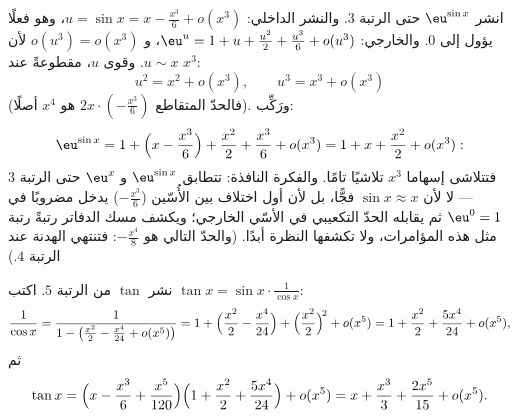 \begin{example}\label{ex:b1:taylor:esin}
انشر $\eu^{\sin x}$ حتى الرتبة $3$. والنشر الداخلي: $u = \sin x
= x - \frac{x^3}{6} + o(x^3)$، وهو فعلًا يؤول إلى $0$. والخارجي:
$\eu^u = 1 + u + \frac{u^2}{2} + \frac{u^3}{6} + o(u^3)$، و
$o(u^3) = o(x^3)$ لأن $u \sim x$. وقوى $u$، مقطوعةً عند
$x^3$:
\[
u^2 = x^2 + o(x^3), \qquad u^3 = x^3 + o(x^3)
\]
(فالحدّ المتقاطع $2x\cdot(-\frac{x^3}{6})$ هو $x^4$ أصلًا).
ورَكِّب:
\[
\eu^{\sin x} = 1 + \Bigl(x - \frac{x^3}{6}\Bigr) + \frac{x^2}{2}
+ \frac{x^3}{6} + o(x^3)
= 1 + x + \frac{x^2}{2} + o(x^3) :
\]
فتتلاشى إسهاما $x^3$ تلاشيًا تامًا. والفكرة النافذة:
تتطابق $\eu^{\sin x}$ و $\eu^x$ حتى الرتبة $3$ --- لا
لأن $\sin x \approx x$ فجًّا، بل لأن أول
اختلاف بين الأُسّين ($-\frac{x^3}{6}$) يدخل
مضروبًا في $\eu^0 = 1$ ثم يقابله الحدّ التكعيبي في
الأسّي الخارجي؛ ويكشف مسك الدفاتر رتبةً رتبة مثل هذه
المؤامرات، ولا تكشفها النظرة أبدًا. (والحدّ التالي هو
$-\frac{x^4}{8}$: فتنتهي الهدنة عند الرتبة $4$.)
\end{example}

\begin{example}\label{ex:b1:taylor:tan}
نشر $\tan$ من الرتبة $5$. اكتب $\tan x =
\sin x \cdot \frac{1}{\cos x}$:
\[
\frac{1}{\cos x} = \frac{1}{1 - \bigl(\frac{x^2}{2} - \frac{x^4}{24}
+ o(x^5)\bigr)}
= 1 + \Bigl(\frac{x^2}{2} - \frac{x^4}{24}\Bigr)
+ \Bigl(\frac{x^2}{2}\Bigr)^{\!2} + o(x^5)
= 1 + \frac{x^2}{2} + \frac{5x^4}{24} + o(x^5),
\]
ثم
\[
\tan x = \Bigl(x - \frac{x^3}{6} + \frac{x^5}{120}\Bigr)
\Bigl(1 + \frac{x^2}{2} + \frac{5x^4}{24}\Bigr) + o(x^5)
= x + \frac{x^3}{3} + \frac{2x^5}{15} + o(x^5) .
\]
\end{example}

